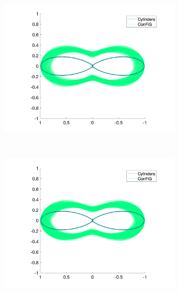 \begin{figure}
  \centering
  \begin{subfigure}[]{0.32\textwidth}
    \includegraphics[width=\textwidth]{figures/frf_experiment/kappa_2_b_3000.png}
    \caption{}
  \end{subfigure}
  ~
  \begin{subfigure}[]{0.32\textwidth}
    \includegraphics[width=\textwidth]{figures/frf_experiment/kappa_6_b_3000.png}
    \caption{}
  \end{subfigure}
  ~
  \begin{subfigure}[]{0.32\textwidth}

\end{subfigure}
\end{figure}
